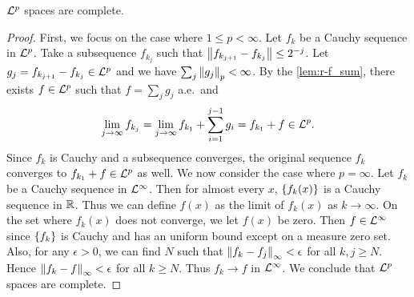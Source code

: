 \begin{theorem}
    $\mathcal{L}^p$ spaces are complete. 
\end{theorem}
\begin{proof}
    First, we focus on the case where $1\leq p<\infty$. Let $f_k$ be a 
    Cauchy sequence in $\mathcal{L}^p$. Take a subsequence $f_{k_j}$ such that 
    $\left\lVert {f_{k_{j+1}}-f_{k_j}} \right\rVert \leq 2^{-j}$. Let 
    $g_j = f_{k_{j+1}}-f_{k_j}\in\mathcal{L}^p$ and we have 
    $\sum_j \left\lVert {g_j} \right\rVert_p < \infty$. By the \cref{lem:r-f_sum}, there exists 
    $f\in\mathcal{L}^p$ such that $f = \sum_j g_j$ a.e.\ and 
    \begin{equation*}
        \lim_{j\to\infty} f_{k_j} = \lim_{j\to\infty} f_{k_1} + \sum_{i=1}^{j-1} g_i 
        = f_{k_1} + f\in\mathcal{L}^p.
    \end{equation*}
    Since $f_k$ is Cauchy and a subsequence converges, the original 
    sequence $f_k$ converges to $f_{k_1} + f\in\mathcal{L}^p$ as well. 
    We now consider the case where $p=\infty$. Let $f_k$ be a Cauchy 
    sequence in $\mathcal{L}^\infty$. Then for almost every $x$, $\left\{ {f_k(x)} \right\}$ 
    is a Cauchy sequence in $\mathbb{R}$. Thus we can define $f(x)$ as the 
    limit of $f_k(x)$ as $k\to\infty$. On the set where $f_k(x)$ does 
    not converge, we let $f(x)$ be zero. Then $f\in\mathcal{L}^\infty$ since 
    $\left\{ {f_k} \right\}$ is Cauchy and has an uniform bound except on a measure 
    zero set. Also, for any $\epsilon>0$, we can find $N$ such that 
    $\left\lVert {f_k - f_j} \right\rVert_\infty < \epsilon$ for all $k,j\geq N$. Hence 
    $\left\lVert {f_k-f} \right\rVert_\infty < \epsilon$ for all $k\geq N$. Thus $f_k\to f$ 
    in $\mathcal{L}^\infty$. We conclude that $\mathcal{L}^p$ spaces are complete.
\end{proof}

